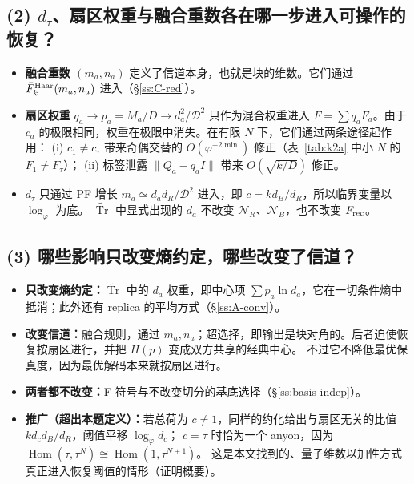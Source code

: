 \documentclass[11pt,a4paper,UTF8]{ctexart}
\newcommand{\tTr}{\widetilde{\operatorname{Tr}}}
\newcommand{\Frec}{F_{\rm rec}}
\begin{document}
\subsection*{(2) \texorpdfstring{$d_\tau$}{d\_τ}、扇区权重与融合重数各在哪一步进入可操作的恢复？}
\begin{itemize}
  \item \textbf{融合重数 $(m_a,n_a)$} 定义了信道本身，也就是块的维数。它们通过 $\bar F^{\rm Haar}_k(m_a,n_a)$ 进入（\S\ref{ss:C-red}）。
  \item \textbf{扇区权重} $q_a\to p_a=M_a/D\to d_a^2/\mathcal D^2$ 只作为混合权重进入 $F=\sum q_aF_a$。由于 $c_a$ 的极限相同，权重在极限中消失。在有限 $N$ 下，它们通过两条途径起作用：
  (i) $c_1\ne c_\tau$ 带来奇偶交替的 $O(\varphi^{-2\min})$ 修正（表~\ref{tab:k2a} 中小 $N$ 的 $F_1\neq F_\tau$）；
  (ii) 标签泄露 $\|Q_a-q_aI\|$ 带来 $O(\sqrt{k/D})$ 修正。
  \item \textbf{$d_\tau$} 只通过 PF 增长 $m_a\simeq d_ad_R/\mathcal D^2$ 进入，即 $c=kd_B/d_R$，所以临界变量以 $\log_\varphi$ 为底。
  $\tTr$ 中显式出现的 $d_a$ 不改变 $\mathcal N_R$、$\mathcal N_B$，也不改变 $\Frec$。
\end{itemize}

\subsection*{(3) 哪些影响只改变熵约定，哪些改变了信道？}
\begin{itemize}
  \item \textbf{只改变熵约定：}$\tTr$ 中的 $d_a$ 权重，即中心项 $\sum p_a\ln d_a$，它在一切条件熵中抵消；此外还有 replica 的平均方式（\S\ref{ss:A-conv}）。
  \item \textbf{改变信道：}融合规则，通过 $m_a,n_a$；超选择，即输出是块对角的。后者迫使恢复按扇区进行，并把 $H(p)$ 变成双方共享的经典中心。
  不过它不降低最优保真度，因为最优解码本来就按扇区进行。
  \item \textbf{两者都不改变：}F-符号与不改变切分的基底选择（\S\ref{ss:basis-indep}）。
  \item \textbf{推广（超出本题定义）：}若总荷为 $c\ne1$，同样的约化给出与扇区无关的比值 $kd_cd_B/d_R$，阈值平移 $\log_\varphi d_c$；
  $c=\tau$ 时恰为一个 anyon，因为 $\operatorname{Hom}(\tau,\tau^N)\cong\operatorname{Hom}(1,\tau^{N+1})$。
  这是本文找到的、量子维数以加性方式真正进入恢复阈值的情形（证明概要）。
\end{itemize}
\end{document}

